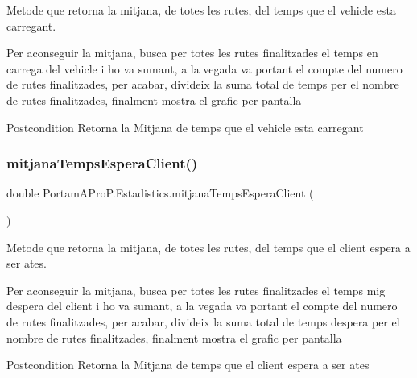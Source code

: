 Metode que retorna la mitjana, de totes les rutes, del temps que el vehicle esta carregant. 

Per aconseguir la mitjana, busca per totes les rutes finalitzades el temps en carrega del vehicle i ho va sumant, a la vegada va portant el compte del numero de rutes finalitzades, per acabar, divideix la suma total de temps per el nombre de rutes finalitzades, finalment mostra el grafic per pantalla

\begin{DoxyPostcond}{Postcondition}
Retorna la Mitjana de temps que el vehicle esta carregant 
\end{DoxyPostcond}
\mbox{\label{class_portam_a_pro_p_1_1_estadistics_a1fe702434660a6f2bb9078a7c1e3fc6d}} 
\subsubsection{\texorpdfstring{mitjana\+Temps\+Espera\+Client()}{mitjanaTempsEsperaClient()}}
{\footnotesize\ttfamily double Portam\+A\+Pro\+P.\+Estadistics.\+mitjana\+Temps\+Espera\+Client (\begin{DoxyParamCaption}{ }\end{DoxyParamCaption})}



Metode que retorna la mitjana, de totes les rutes, del temps que el client espera a ser ates. 

Per aconseguir la mitjana, busca per totes les rutes finalitzades el temps mig d\textquotesingle{}espera del client i ho va sumant, a la vegada va portant el compte del numero de rutes finalitzades, per acabar, divideix la suma total de temps d\textquotesingle{}espera per el nombre de rutes finalitzades, finalment mostra el grafic per pantalla

\begin{DoxyPostcond}{Postcondition}
Retorna la Mitjana de temps que el client espera a ser ates 
\end{DoxyPostcond}
\mbox{\label{class_portam_a_pro_p_1_1_estadistics_a32bdc62dbae367138c84f6cd1331fb9f}} 
